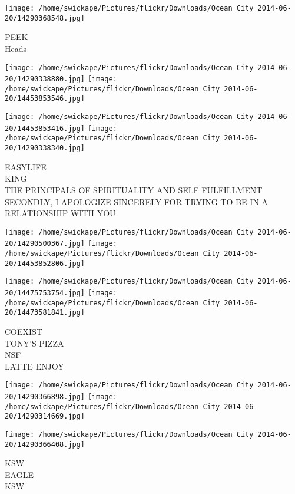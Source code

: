 \documentclass[10pt,letterpaper]{article}
\begin{document}
\vspace{0.25in}
\texttt{[image: /home/swickape/Pictures/flickr/Downloads/Ocean City 2014-06-20/14290368548.jpg]}

PEEK\\
Heads\\
\pagebreak

\texttt{[image: /home/swickape/Pictures/flickr/Downloads/Ocean City 2014-06-20/14290338880.jpg]}
\texttt{[image: /home/swickape/Pictures/flickr/Downloads/Ocean City 2014-06-20/14453853546.jpg]}

\texttt{[image: /home/swickape/Pictures/flickr/Downloads/Ocean City 2014-06-20/14453853416.jpg]}
\texttt{[image: /home/swickape/Pictures/flickr/Downloads/Ocean City 2014-06-20/14290338340.jpg]}

EASYLIFE\\
KING\\
THE PRINCIPALS OF SPIRITUALITY AND SELF FULFILLMENT\\
SECONDLY, I APOLOGIZE SINCERELY FOR TRYING TO BE IN A RELATIONSHIP WITH YOU\\
\pagebreak

\texttt{[image: /home/swickape/Pictures/flickr/Downloads/Ocean City 2014-06-20/14290500367.jpg]}
\texttt{[image: /home/swickape/Pictures/flickr/Downloads/Ocean City 2014-06-20/14453852806.jpg]}

\texttt{[image: /home/swickape/Pictures/flickr/Downloads/Ocean City 2014-06-20/14475753754.jpg]}
\texttt{[image: /home/swickape/Pictures/flickr/Downloads/Ocean City 2014-06-20/14473581841.jpg]}

COEXIST\\
TONY'S PIZZA\\
NSF\\
LATTE ENJOY\\
\pagebreak

\texttt{[image: /home/swickape/Pictures/flickr/Downloads/Ocean City 2014-06-20/14290366898.jpg]}
\texttt{[image: /home/swickape/Pictures/flickr/Downloads/Ocean City 2014-06-20/14290314669.jpg]}

\texttt{[image: /home/swickape/Pictures/flickr/Downloads/Ocean City 2014-06-20/14290366408.jpg]}

KSW\\
EAGLE\\
KSW\\
\pagebreak
\end{document}
